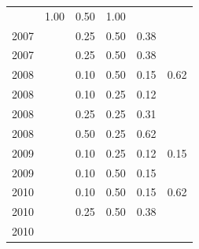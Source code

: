 \begin{table}[H]
\begin{tabular}{| l | c | c | c | c | c |}
          &
          1.00
          &
          0.50
          &
          1.00
          &
          \\
            2007
          &
          
          &
          0.25
          &
          0.50
          &
          0.38
          &
          \\
            2007
          &
          
          &
          0.25
          &
          0.50
          &
          0.38
          &
          \\
\hline
            2008
          &
          
          &
          0.10
          &
          0.50
          &
          0.15
          &
            {\color{blue} 0.62}
          \\
            2008
          &
          
          &
          0.10
          &
          0.25
          &
          0.12
          &
          \\
            2008
          &
          
          &
          0.25
          &
          0.25
          &
          0.31
          &
          \\
            2008
          &
          
          &
          0.50
          &
          0.25
          &
          0.62
          &
          \\
\hline
            2009
          &
          
          &
          0.10
          &
          0.25
          &
          0.12
          &
            {\color{red} 0.15}
          \\
            2009
          &
          
          &
          0.10
          &
          0.50
          &
          0.15
          &
          \\
\hline
            2010
          &
          
          &
          0.10
          &
          0.50
          &
          0.15
          &
            {\color{blue} 0.62}
          \\
            2010
          &
          
          &
          0.25
          &
          0.50
          &
          0.38
          &
          \\
            2010
          &
          

\end{tabular}
\end{table}
